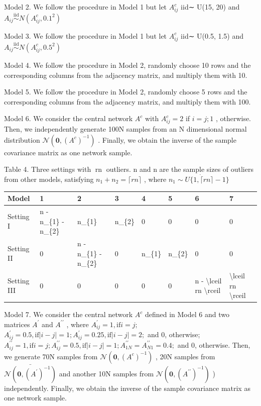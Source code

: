 \documentclass[
  10
]{article}
\newcounter{none} %
\begin{document}
Model 2. We follow the procedure in Model 1 but let
\(A _ { i j } ^ { c }\) iid∼ U(15, 20) and
\(A _ { i j } \stackrel { \mathrm { i i d } } { \sim } N ( A _ { i j } ^ { c } , 0 . 1 ^ { 2 } )\)

Model 3. We follow the procedure in Model 1 but let
\(A _ { i j } ^ { c }\) iid∼ U(0.5, 1.5) and
\(A _ { i j } \stackrel { \mathrm { i i d } } { \sim } N ( A _ { i j } ^ { c } , 0 . 5 ^ { 2 } )\)

Model 4. We follow the procedure in Model 2, randomly choose 10 rows and
the corresponding columns from the adjacency matrix, and multiply them
with 10.

Model 5. We follow the procedure in Model 2, randomly choose 5 rows and
the corresponding columns from the adjacency matrix, and multiply them
with 100.

Model 6. We consider the central network \(A ^ { c }\) with
\(A _ { i j } ^ { c } = 2\) if \(i = j ; 1\) , otherwise. Then, we
independently generate 100N samples from an N dimensional normal
distribution
\(\mathcal { N } ( \mathbf { 0 } , ( A ^ { c } ) ^ { - 1 } )\) .
Finally, we obtain the inverse of the sample covariance matrix as one
network sample.

Table 4. Three settings with rn outliers. n and n are the sample sizes
of outliers from other models, satisfying
\(n _ { 1 } + n _ { 2 } = \lceil r n \rceil\) , where
\(n _ { 1 } \sim U \{ 1 , \dot { \lceil } r n \rceil - 1 \}\)

{\def\LTcaptype{none} %
\begin{longtable}[]{@{}|l|l|l|l|l|l|l|l|@{}}
\toprule\noalign{}
\endhead
\bottomrule\noalign{}
\endlastfoot
\hline
Model & 1 & 2 & 3 & 4 & 5 & 6 & 7 \\
\hline
Setting I & n - n\_\{1\} - n\_\{2\} & n\_\{1\} & n\_\{2\} & 0 & 0 & 0 &
0 \\
\hline
Setting II & 0 & n - n\_\{1\} - n\_\{2\} & 0 & n\_\{1\} & n\_\{2\} & 0 &
0 \\
\hline
Setting III & 0 & 0 & 0 & 0 & 0 & n - \textbackslash lceil rn
\textbackslash rceil & \textbackslash lceil rn \textbackslash rceil \\
\hline
\end{longtable}
}

Model 7. We consider the central network \(A ^ { c }\) defined in Model
6 and two matrices \(A ^ { \prime }\) and \(A ^ { \prime \prime }\) ,
where \(A _ { i j } ^ { \prime } = 1 , \mathrm { i f } i = j ;\)
\(A _ { i j } ^ { \prime } = 0 . 5 , \mathrm { i f } | i - j | = 1 ; A _ { i j } ^ { \prime } = 0 . 2 5 , \mathrm { i f } | i - j | = 2 ;\)
and 0, otherwise;
\(A _ { i j } ^ { \prime \prime } = 1 , \mathrm { i f } i = j ; A _ { i j } ^ { \prime \prime } = 0 . 5 , \mathrm { i f } | i - j | = 1 ; A _ { 1 N } ^ { \prime \prime } = A _ { N 1 } ^ { \prime \prime } = 0 . 4 ;\)
and 0, otherwise. Then, we generate 70N samples from
\(\mathcal { N } ( \mathbf { 0 } , ( A ^ { c } ) ^ { - 1 } )\) , 20N
samples from
\(\bar { \mathcal { N } ( \mathbf { 0 } , ( A ^ { \prime } ) ^ { - 1 } ) }\)
and another 10N samples from
\(\mathcal { N } ( \mathbf { 0 } , ( A ^ { \prime \prime } ) ^ { - 1 } )\)
) independently. Finally, we obtain the inverse of the sample covariance
matrix as one network sample.
\end{document}
